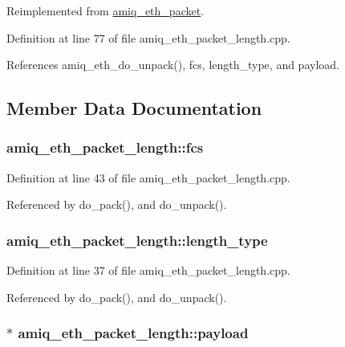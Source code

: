 Reimplemented from \hyperlink{classamiq__eth__packet_a909eb3860185125564fa530496ed1c9e}{amiq\_\-eth\_\-packet}.

Definition at line 77 of file amiq\_\-eth\_\-packet\_\-length.cpp.

References amiq\_\-eth\_\-do\_\-unpack(), fcs, length\_\-type, and payload.

\subsection{Member Data Documentation}
\hypertarget{classamiq__eth__packet__length_a955aef311a4f2fb0e7d9f10aa756e68a}{
\subsubsection[{fcs}]{ {\bf amiq\_\-eth\_\-packet\_\-length::fcs}}}
\label{classamiq__eth__packet__length_a955aef311a4f2fb0e7d9f10aa756e68a}


Definition at line 43 of file amiq\_\-eth\_\-packet\_\-length.cpp.

Referenced by do\_\-pack(), and do\_\-unpack().\hypertarget{classamiq__eth__packet__length_aed41233fe35015c65e02b57a496e2072}{
\subsubsection[{length\_\-type}]{ {\bf amiq\_\-eth\_\-packet\_\-length::length\_\-type}}}
\label{classamiq__eth__packet__length_aed41233fe35015c65e02b57a496e2072}


Definition at line 37 of file amiq\_\-eth\_\-packet\_\-length.cpp.

Referenced by do\_\-pack(), and do\_\-unpack().\hypertarget{classamiq__eth__packet__length_a66584df88e48a4d67f104806d762636a}{
\subsubsection[{payload}]{$\ast$ {\bf amiq\_\-eth\_\-packet\_\-length::payload}}}
\label{classamiq__eth__packet__length_a66584df88e48a4d67f104806d762636a}


